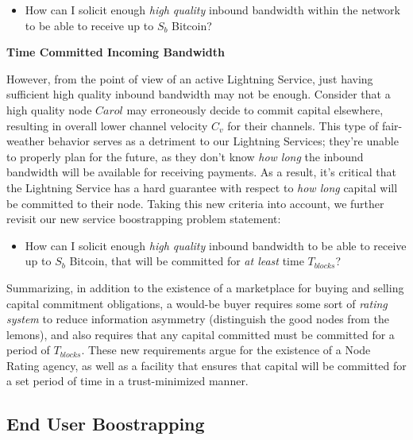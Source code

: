 \documentclass[10pt,a4paper]{article}
\theoremstyle{definition}
\begin{document}
\begin{itemize}
        \item How can I solicit enough \emph{high quality} inbound bandwidth
            within the network to be able to receive up to $S_b$ Bitcoin?
\end{itemize}

\begin{center}
	\textbf{Time Committed Incoming Bandwidth}
\end{center}


However, from the point of view of an active Lightning Service, just having
sufficient high quality inbound bandwidth may not be enough. Consider that a
high quality node $Carol$ may erroneously decide to commit capital elsewhere,
resulting in overall lower channel velocity $C_v$ for their channels. This
type of fair-weather behavior serves as a detriment to our Lightning Services;
they're unable to properly plan for the future, as they don't know \emph{how
long} the inbound bandwidth will be available for receiving payments. As a
result, it's critical that the Lightning Service has a hard guarantee with
respect to \emph{how long} capital will be committed to their node. Taking this
new criteria into account, we further revisit our new service boostrapping
problem statement:

\begin{itemize}
        \item How can I solicit enough \emph{high quality} inbound bandwidth
             to be able to receive up to $S_b$ Bitcoin, that
            will be committed for \emph{at least} time $T_{blocks}$?
\end{itemize}

Summarizing, in addition to the existence of a marketplace for buying and
selling capital commitment obligations, a would-be buyer requires some sort of
\emph{rating system} to reduce information asymmetry (distinguish the good
nodes from the lemons), and also requires that any capital committed must be
committed for a period of $T_{blocks}$. These new requirements argue for the
existence of a Node Rating agency, as well as a facility that ensures that
capital will be committed for a set period of time in a trust-minimized manner.


\subsection{End User Boostrapping}
\end{document}

